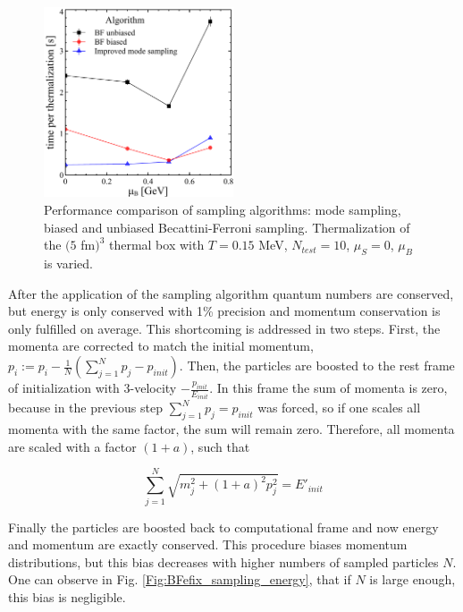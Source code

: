\begin{figure}
  \centering
  \includegraphics[width=0.5\textwidth]{plots/forced_thermalization/algo_runtime.pdf}
  \caption{Performance comparison of sampling algorithms: mode sampling, biased
           and unbiased Becattini-Ferroni sampling. Thermalization of the $(5$ fm$)^3$
           thermal box with $T = 0.15$ MeV, $N_{test} = 10$, $\mu_S = 0$, $\mu_B$ is
           varied.}
  \label{Fig:algo_compar}
\end{figure}

After the application of the sampling algorithm quantum numbers are conserved,
but energy is only conserved with 1\% precision and momentum conservation is
only fulfilled on average. This shortcoming is addressed in two steps. First,
the momenta are corrected to match the initial momentum, $p_i := p_i -
\frac{1}{N}(\sum_{j=1}^N p_j - p_{init})$. Then, the particles are boosted to the rest
frame of initialization with 3-velocity $-\frac{p_{init}}{E_{init}}$. In this
frame the sum of momenta is zero, because in the previous step
$\sum_{j=1}^N p_j = p_{init}$ was forced, so if one scales all momenta with the same
factor, the sum will remain zero. Therefore, all momenta are scaled with a factor
$(1+a)$, such that

\begin{equation}
  \sum_{j=1}^N \sqrt{m_j^2 + (1+a)^2 p_j^2} = E'_{init}
\end{equation}

Finally the particles are boosted back to computational frame and now energy and
momentum are exactly conserved. This procedure biases momentum distributions,
but this bias decreases with higher numbers of sampled particles $N$. One can
observe in Fig. \ref{Fig:BFefix_sampling_energy}, that if $N$ is large enough,
this bias is negligible.

